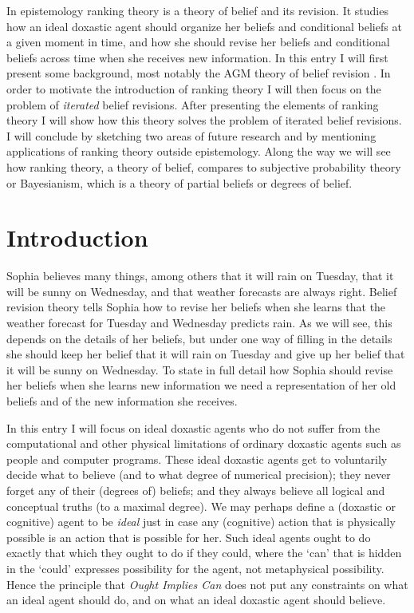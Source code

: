 In epistemology ranking theory is a theory of belief and its revision. It studies how an ideal doxastic agent should organize her beliefs and conditional beliefs at a given moment in time, and how she should revise her beliefs and conditional beliefs across time when she receives new information. In this entry I will first present some background, most notably the AGM theory of belief revision \citep{agm85}. In order to motivate the introduction of ranking theory I will then focus on the problem of \emph{iterated} belief revisions. After presenting the elements of ranking theory \citep{s88, s12} I will show how this theory solves the problem of iterated belief revisions. I will conclude by sketching two areas of future research and by mentioning applications of ranking theory outside epistemology. Along the way we will see how ranking theory, a theory of belief, compares to subjective probability theory or Bayesianism, which is a theory of partial beliefs or degrees of belief.


\section{Introduction}

Sophia believes many things, among others that it will rain on Tuesday, that it will be sunny on Wednesday, and that weather forecasts are always right. Belief revision theory tells Sophia how to revise her beliefs when she learns %
that the weather forecast for Tuesday and Wednesday predicts rain. As we will see, this depends on the details of her beliefs, but under one way of filling in the details she should keep her belief that it will rain on Tuesday and give up her belief that it will be sunny on Wednesday. To state in full detail how Sophia should revise her beliefs when she learns new information we need a representation of her old beliefs and of the new information she receives.

In this entry I will focus on ideal doxastic agents who do not suffer from the computational and other physical limitations of ordinary doxastic agents such as people and computer programs. These ideal doxastic agents get to voluntarily decide what to believe (and to what degree of numerical precision); they never forget any of their (degrees of) beliefs; and they always believe all logical and conceptual truths (to a maximal degree). We may perhaps define a (doxastic or cognitive) agent to be \emph{ideal} just in case any (cognitive) action that is physically possible is an action that is possible for her. Such ideal agents ought to do exactly that which they ought to do if they could, where the `can' that is hidden in the `could' expresses possibility for the agent, not metaphysical possibility. Hence the principle that \emph{Ought Implies Can} does not put any constraints on what an ideal agent should do, and on what an ideal doxastic agent should believe.

